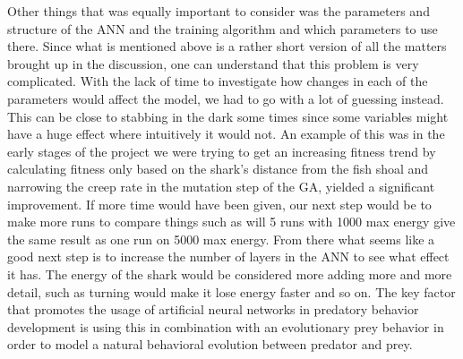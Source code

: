 Other things that was equally important to consider was the parameters and structure of the ANN and the training algorithm and which parameters to use there. Since what is mentioned above is a rather short version of all the matters brought up in the discussion, one can understand that this problem is very complicated. With the lack of time to investigate how changes in each of the parameters would affect the model, we had to go with a lot of guessing instead. This can be close to stabbing in the dark some times since some variables might have a huge effect where intuitively it would not. An example of this was in the early stages of the project we were trying to get an increasing fitness trend by calculating fitness only based on the shark's distance from the fish shoal and narrowing the creep rate in the mutation step of the GA, yielded a significant improvement.
If more time would have been given, our next step would be to make more runs to compare things such as will 5 runs with 1000 max energy give the same result as one run on 5000 max energy. From there what seems like a good next step is to increase the number of layers in the ANN to see what effect it has. The energy of the shark would be considered more adding more and more detail, such as turning would make it lose energy faster and so on. 
The key factor that promotes the usage of artificial neural networks in
predatory behavior development is using this in combination with an
evolutionary prey behavior in order to model a natural behavioral evolution
between predator and prey.
